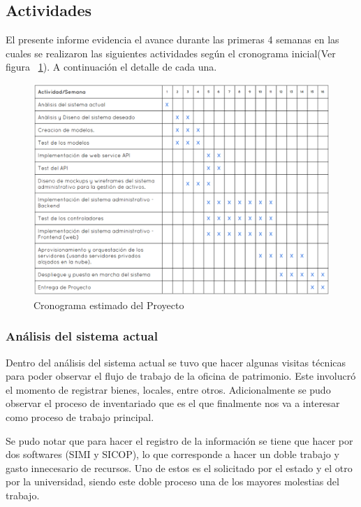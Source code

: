 \subsection{Actividades}

El presente informe evidencia el avance durante las primeras 4 semanas en las cuales se realizaron las siguientes actividades según el cronograma inicial(Ver figura ~\ref{fig:cronograma-camila}). A continuación el detalle de cada una.

\begin{figure}[h!]
  \centering
  \includegraphics[scale=0.38]{images/activities/camila/cronograma-camila.png}
  \caption{Cronograma estimado del Proyecto}
  \label{fig:cronograma-camila}
\end{figure}

\subsubsection{Análisis del sistema actual}

Dentro del análisis del sistema actual se tuvo que hacer algunas visitas técnicas para poder observar el flujo de trabajo de la oficina de patrimonio. Este involucró el momento de registrar bienes, locales, entre otros. Adicionalmente se pudo observar el proceso de inventariado que es el que finalmente nos va a interesar como proceso de trabajo principal.

Se pudo notar que para hacer el registro de la información se tiene que hacer por dos softwares (SIMI y SICOP), lo que corresponde a hacer un doble trabajo y gasto innecesario de recursos. Uno de estos es el solicitado por el estado y el otro por la universidad, siendo este doble proceso una de los mayores molestias del trabajo.

